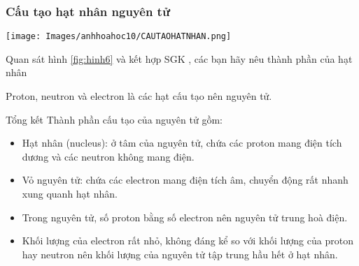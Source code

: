 \subsubsection{Cấu tạo hạt nhân nguyên tử}
\begin{center}
	\texttt{[image: Images/anhhoahoc10/CAUTAOHATNHAN.png]}\\
	\label{fig:hinh6}
\end{center}
\begin{hoivadap}
	\begin{cauhoi}
		Quan sát hình \ref{fig:hinh6} và kết hợp SGK , các bạn hãy nêu thành phần của hạt nhân
	\end{cauhoi}
\end{hoivadap}
\begin{ghinho}
	Proton, neutron và electron là các hạt cấu tạo nên nguyên tử.
\end{ghinho}
\begin{tongket}{Tổng kết}
	Thành phần cấu tạo của nguyên tử gồm:
	\begin{itemize}
		\item  Hạt nhân (nucleus): ở tâm của nguyên tử, chứa các proton mang điện tích dương và các neutron không mang điện.
		\item Vỏ nguyên tử: chứa các electron mang điện tích âm, chuyển động rất nhanh xung quanh hạt nhân.
		\item Trong nguyên tử, số proton bằng số electron nên nguyên tử trung hoà điện.
		\item Khối lượng của electron rất nhỏ, không đáng kể so với khối lượng của proton hay neutron nên khối lượng của nguyên tử tập trung hầu hết ở hạt nhân.
	\end{itemize}
\end{tongket}
%
%
